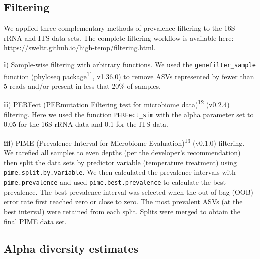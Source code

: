 \documentclass[
  10pt,
  letterpaper,
  DIV=11,
  numbers=noendperiod]{scrartcl}
\begin{document}
\hypertarget{filtering}{%
\subsection{Filtering}\label{filtering}}

We applied three complementary methods of prevalence filtering to the
16S rRNA and ITS data sets. The complete filtering workflow is available
here: \url{https://sweltr.github.io/high-temp/filtering.html}.

\textbf{i}) Sample-wise filtering with arbitrary functions. We used the
\texttt{genefilter\_sample} function (phyloseq
package\textsuperscript{11}, v1.36.0) to remove ASVs represented by
fewer than 5 reads and/or present in less that 20\% of samples.

\textbf{ii}) PERFect (PERmutation Filtering test for microbiome
data)\textsuperscript{12} (v0.2.4) filtering. Here we used the function
\texttt{PERFect\_sim} with the alpha parameter set to 0.05 for the 16S
rRNA data and 0.1 for the ITS data.

\textbf{iii}) PIME (Prevalence Interval for Microbiome
Evaluation)\textsuperscript{13} (v0.1.0) filtering. We rarefied all
samples to even depths (per the developer's recommendation) then split
the data sets by predictor variable (temperature treatment) using
\texttt{pime.split.by.variable}. We then calculated the prevalence
intervals with \texttt{pime.prevalence} and used
\texttt{pime.best.prevalence} to calculate the best prevalence. The best
prevalence interval was selected when the out-of-bag (OOB) error rate
first reached zero or close to zero. The most prevalent ASVs (at the
best interval) were retained from each split. Splits were merged to
obtain the final PIME data set.

\hypertarget{alpha-diversity-estimates}{%
\subsection{Alpha diversity estimates}\label{alpha-diversity-estimates}}
\end{document}

